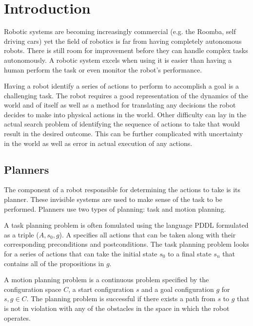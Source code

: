\chapter{Introduction} \label{intro}
Robotic systems are becoming increasingly commercial (e.g. the Roomba, self driving cars) yet the field of robotics is far from having completely autonomous robots. There is still room for improvement before they can handle complex tasks autonomously. A robotic system excels when using it is easier than having a human perform the task or even monitor the robot's performance.

Having a robot identify a series of actions to perform to accomplish a goal is a challenging task. The robot requires a good representation of the dynamics of the world and of itself as well as a method for translating any decisions the robot decides to make into physical actions in the world. Other difficulty can lay in the actual search problem of identifying the sequence of actions to take that would result in the desired outcome. This can be further complicated with uncertainty in the world as well as error in actual execution of any actions.

\section{Planners} \label{intro:planners}
The component of a robot responsible for determining the actions to take is its planner. These invisible systems are used to make sense of the task to be performed. Planners use two types of planning: task and motion planning. 

A task planning problem is often fomulated using the language PDDL  formulated as a triple ($A, s_0, g$). A specifies all actions that can be taken along with their corresponding preconditions and postconditions. The task planning problem looks for a series of actions that can take the initial state $s_0$ to a final state $s_{n}$ that contains all of the propositions in $g$. 

A motion planning problem is a continuous problem specified by the configuration space $C$, a start configuration $s$ and a goal configuration $g$ for $s,g \in C$. The planning problem is successful if there exists a path from $s$ to $g$ that is not in violation with any of the obstacles in the space in which the robot operates.  

